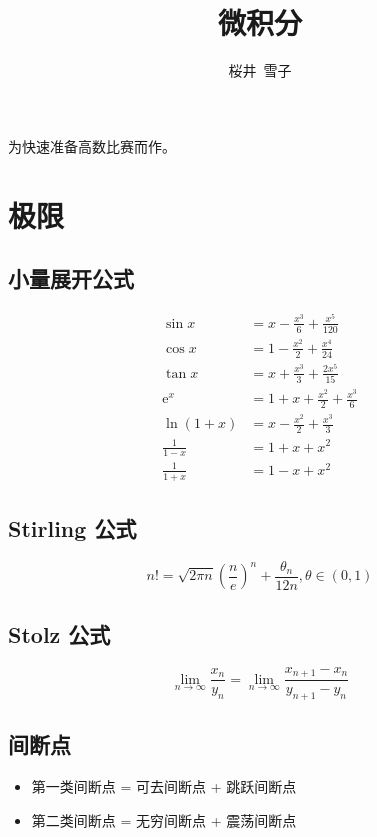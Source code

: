 \documentclass{article}
\title{微积分}
\author{桜井\ 雪子}
\date{}
\begin{document}
\maketitle

为快速准备高数比赛而作。


\section{极限}

\subsection{小量展开公式}

\begin{align*}
    \sin x          & = x - \frac{x^3}{6} + \frac{x^5}{120}   \\
    \cos x          & = 1 - \frac{x^2}{2} + \frac{x^4}{24}    \\
    \tan x          & = x + \frac{x^3}{3} + \frac{2 x^5}{15}  \\
    \mathrm{e}^x    & = 1 + x + \frac{x^2}{2} + \frac{x^3}{6} \\
    \ln (1 + x)     & = x - \frac{x^2}{2} + \frac{x^3}{3}     \\
    \frac{1}{1 - x} & = 1 + x + x^2                           \\
    \frac{1}{1 + x} & = 1 - x + x^2
\end{align*}

\subsection{Stirling 公式}

\[ n! = \sqrt{2 \pi n} \left(\frac{n}{e}\right)^n + \frac{\theta_n}{12 n}, \theta \in (0, 1) \]

\subsection{Stolz 公式}

\[ \lim_{n \to \infty} \frac{x_n}{y_n} = \lim_{n \to \infty} \frac{x_{n+1} - x_n}{y_{n+1} - y_n} \]

\subsection{间断点}

\begin{itemize}
    \item 第一类间断点 = 可去间断点 + 跳跃间断点
    \item 第二类间断点 = 无穷间断点 + 震荡间断点
\end{itemize}
\end{document}
